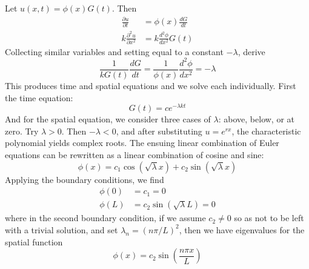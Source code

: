 \documentclass[a4paper]{article}
\begin{document}

Let \( u \!\left( x,t \right) = \phi \!\left( x \right)G \!\left( t \right) \). Then
\begin{align*}
	\frac{\partial u}{\partial t} & = \phi \!\left( x \right) \frac{d G}{d t} \\
	k \frac{\partial^2 u}{\partial x^2} & = k\frac{d^2 \phi}{d x^2}G \!\left( t \right)
\end{align*}
Collecting similar variables and setting equal to a constant \( -\lambda \), derive
\[
	 \frac{1}{k G \!\left( t \right)}\frac{d G}{d t} = \frac{1}{\phi \!\left( x \right)}\frac{d^2 \phi}{d x^2} = -\lambda
\]
This produces time and spatial equations and we solve each individually. First the time equation:
\[
	G \!\left( t \right) = ce^{-\lambda kt} 
\]
And for the spatial equation, we consider three cases of \( \lambda \): above, below, or at zero. Try \( \lambda > 0 \). Then \( -\lambda < 0 \), and after substituting \( u = e^{rx} \), the characteristic polynomial yields complex roots. The ensuing linear combination of Euler equations can be rewritten as a linear combination of cosine and sine:
\[
	\phi \!\left( x \right) = c_{1}\cos\!\left(\sqrt{\lambda}x\right) + c_{2}\sin\!\left(\sqrt{\lambda}x\right) 
\]
Applying the boundary conditions, we find
\begin{align*}
	\phi \!\left( 0 \right) & = c_{1} = 0 \\
	\phi \!\left( L \right) & = c_{2}\sin\!\left(\sqrt{\lambda}L\right) = 0
\end{align*}
where in the second boundary condition, if we assume \( c_{2} \neq 0 \) so as not to be left with a trivial solution, and set \( \lambda_{n} = \!\left( n \pi / L \right)^{2} \), then we have eigenvalues for the spatial function
\[
	\phi \!\left( x \right) = c_{2}\sin\!\left( \frac{n \pi x}{L}\right) 
\]
\end{document}
